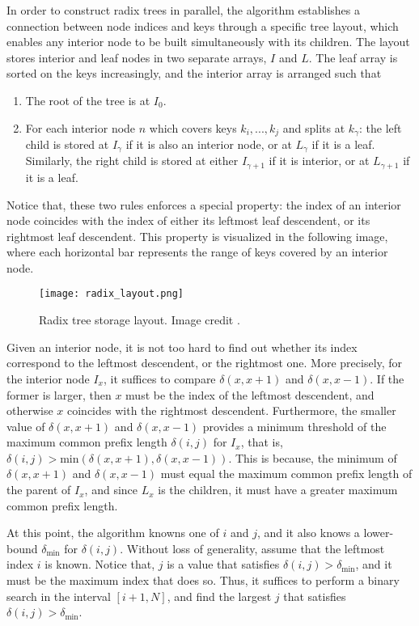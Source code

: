 In order to construct radix trees in parallel, the algorithm\cite{bvh_build} establishes a connection between node indices and keys through a specific tree layout, which enables any interior node to be built simultaneously with its children. The layout stores interior and leaf nodes in two separate arrays, $I$ and $L$. The leaf array is sorted on the keys increasingly, and the interior array is arranged such that
\begin{enumerate}
    \item The root of the tree is at $I_0$.
    
    \item For each interior node $n$ which covers keys $k_i,...,k_j$ and splits at $k_\gamma$: the left child is stored at $I_\gamma$ if it is also an interior node, or at $L_\gamma$ if it is a leaf. Similarly, the right child is stored at either $I_{\gamma+1}$ if it is interior, or at $L_{\gamma+1}$ if it is a leaf.
\end{enumerate}

Notice that, these two rules enforces a special property: the index of an interior node coincides with the index of either its leftmost leaf descendent, or its rightmost leaf descendent. This property is visualized in the following image, where each horizontal bar represents the range of keys covered by an interior node.
\begin{figure}[H]
    \centering
    \texttt{[image: radix\_layout.png]}
    \caption{Radix tree storage layout. Image credit \cite{bvh_build}.}
\end{figure}

Given an interior node, it is not too hard to find out whether its index correspond to the leftmost descendent, or the rightmost one. More precisely, for the interior node $I_{x}$, it suffices to compare $\delta(x,x+1)$ and $\delta(x,x-1)$. If the former is larger, then $x$ must be the index of the leftmost descendent, and otherwise $x$ coincides with the rightmost descendent. Furthermore, the smaller value of $\delta(x,x+1)$ and $\delta(x,x-1)$ provides a minimum threshold of the maximum common prefix length $\delta(i,j)$ for $I_x$, that is, $\delta(i,j)> \text{min}(\delta(x,x+1),\delta(x,x-1))$. This is because, the minimum of $\delta(x,x+1)$ and $\delta(x,x-1)$ must equal the maximum common prefix length of the parent of $I_x$, and since $L_x$ is the children, it must have a greater maximum common prefix length. 

At this point, the algorithm knowns one of $i$ and $j$, and it also knows a lower-bound $\delta_{\text{min}}$ for $\delta(i,j)$. Without loss of generality, assume that the leftmost index $i$ is known. Notice that, $j$ is a value that satisfies $\delta(i,j)>\delta_{\text{min}}$, and it must be the maximum index that does so. Thus, it suffices to perform a binary search in the interval $[i+1,N]$, and find the largest $j$ that satisfies $\delta(i,j)>\delta_{\text{min}}$. 

